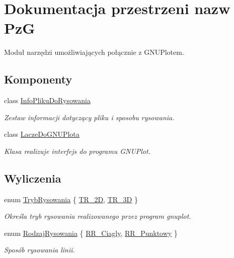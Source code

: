 \hypertarget{namespace_pz_g}{}\section{Dokumentacja przestrzeni nazw PzG}
\label{namespace_pz_g}


Moduł narzędzi umożliwiających połącznie z G\+N\+U\+Plotem.  


\subsection*{Komponenty}
\begin{DoxyCompactItemize}
\item 
class \hyperlink{class_pz_g_1_1_info_pliku_do_rysowania}{Info\+Pliku\+Do\+Rysowania}
\begin{DoxyCompactList}\small\item\em Zestaw informacji dotyczący pliku i sposobu rysowania. \end{DoxyCompactList}\item 
class \hyperlink{class_pz_g_1_1_lacze_do_g_n_u_plota}{Lacze\+Do\+G\+N\+U\+Plota}
\begin{DoxyCompactList}\small\item\em Klasa realizuje interfejs do programu G\+N\+U\+Plot. \end{DoxyCompactList}\end{DoxyCompactItemize}
\subsection*{Wyliczenia}
\begin{DoxyCompactItemize}
\item 
enum \hyperlink{namespace_pz_g_aeedae1ef10c66d720f9e89de408ca4ca}{Tryb\+Rysowania} \{ \hyperlink{namespace_pz_g_aeedae1ef10c66d720f9e89de408ca4caa5eb0cf8b3405e136f092efdb489d60c4}{T\+R\+\_\+2D}, 
\hyperlink{namespace_pz_g_aeedae1ef10c66d720f9e89de408ca4caa856e6b0fa6b8a9dc184c60cf27dcc5d2}{T\+R\+\_\+3D}
 \}\begin{DoxyCompactList}\small\item\em Określa tryb rysowania realizowanego przez program {\ttfamily gnuplot}. \end{DoxyCompactList}
\item 
enum \hyperlink{namespace_pz_g_a705c92106f39b7d0c34a6739d10ff0b6}{Rodzaj\+Rysowania} \{ \hyperlink{namespace_pz_g_a705c92106f39b7d0c34a6739d10ff0b6a927eaa159aa4bd3198f0a330b967746d}{R\+R\+\_\+\+Ciagly}, 
\hyperlink{namespace_pz_g_a705c92106f39b7d0c34a6739d10ff0b6aa01097ee8266d6402b752ef6f9a4690c}{R\+R\+\_\+\+Punktowy}
 \}\begin{DoxyCompactList}\small\item\em Sposób rysowania linii. \end{DoxyCompactList}
\end{DoxyCompactItemize}
